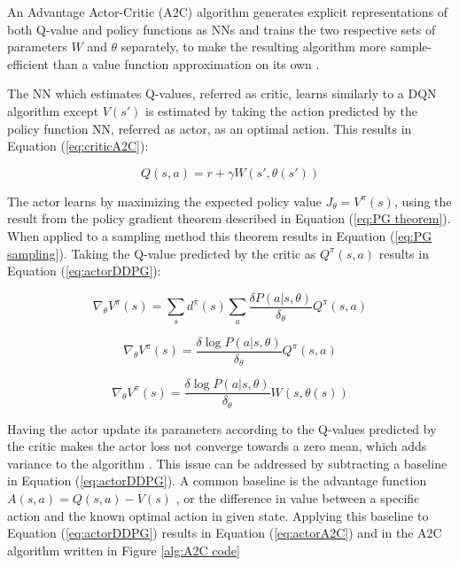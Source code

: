 \documentclass[journal]{IEEEtran}
\begin{document}
		An Advantage Actor-Critic (A2C) algorithm generates explicit representations of both Q-value and policy functions as NNs and trains the two respective sets of parameters $W$ and $\theta$ separately, to make the resulting algorithm more sample-efficient than a value function approximation on its own \cite{konda2000actor}.
		
		The NN which estimates Q-values, referred as critic, learns similarly to a DQN algorithm except $V(s')$ is estimated by taking the action predicted by the policy function NN, referred as actor, as an optimal action. This results in Equation (\ref{eq:criticA2C}):
		
		\begin{equation} \label{eq:criticA2C}
			Q(s,a) = r + \gamma W(s', \theta(s'))
		\end{equation}
		
		The actor learns by maximizing the expected policy value $J_\theta = V^\pi(s)$,  using the result from the policy gradient theorem \cite{Sutton-PGRL} described in Equation (\ref{eq:PG theorem}). When applied to a sampling method \cite{Aihara-BOOT_PG} this theorem results in Equation (\ref{eq:PG sampling}). Taking the Q-value predicted by the critic as $Q^\pi(s,a)$ results in Equation (\ref{eq:actorDDPG}): 
		
		\begin{equation} \label{eq:PG theorem}
			\nabla_\theta V^\pi(s) = \sum_s d^\pi(s) \sum_a \frac{\delta P(a|s, \theta)}{\delta_\theta} Q^\pi(s,a)
		\end{equation}
		
		\begin{equation} \label{eq:PG sampling}
			\nabla_\theta V^\pi(s) = \frac{\delta \log P(a|s, \theta)}{\delta_\theta} Q^\pi(s,a)
		\end{equation}
		
		\begin{equation} \label{eq:actorDDPG}
			\nabla_\theta V^\pi(s) = \frac{\delta \log P(a|s, \theta)}{\delta_\theta} W(s, \theta(s))
		\end{equation}
		
		Having the actor update its parameters according to the Q-values predicted by the critic makes the actor loss not converge towards a zero mean, which adds variance to the algorithm \cite{bhatnagar2008incremental}. This issue can be addressed by subtracting a baseline in Equation (\ref{eq:actorDDPG}). A common baseline is the advantage function $A(s,a) = Q(s,a) - V(s)$ \cite{su2017sample}, or the difference in value between a specific action and the known optimal action in given state. Applying this baseline to Equation (\ref{eq:actorDDPG}) results in Equation (\ref{eq:actorA2C}) and in the A2C algorithm written in Figure \ref{alg:A2C code}
\end{document}
